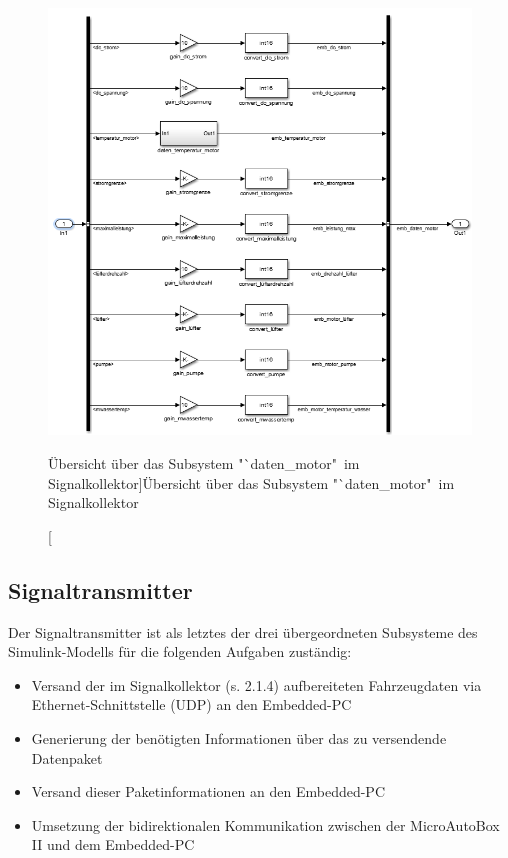 \documentclass[fontsize = 12pt, paper = a4]{scrreprt}
\begin{document}
\begin{figure}[h]
\centering
\includegraphics[scale = 0.75]{sc_daten_motor}
\caption[Übersicht über das Subsystem "`daten\_motor"\ im Signalkollektor]{Übersicht über das Subsystem "`daten\_motor"\ im Signalkollektor}
\label{scdatenmotor}
\end{figure} 

\newpage



\subsection{Signaltransmitter}
 
Der Signaltransmitter ist als letztes der drei übergeordneten Subsysteme des Simulink-Modells für die folgenden Aufgaben zuständig:

\begin{itemize}

\item Versand der im Signalkollektor (s. 2.1.4) aufbereiteten Fahrzeugdaten via Ethernet-Schnittstelle (UDP) an den Embedded-PC

\item Generierung der benötigten Informationen über das zu versendende Datenpaket

\item Versand dieser Paketinformationen an den Embedded-PC

\item Umsetzung der bidirektionalen Kommunikation zwischen der MicroAutoBox II und dem Embedded-PC

\end{itemize}
\end{document}
